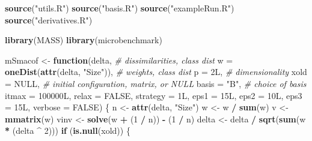 \documentclass[
  12pt,
]{article}
\newenvironment{Shaded}{\begin{snugshade}}{\end{snugshade}}
\newcommand{\AttributeTok}[1]{\textcolor[rgb]{0.13,0.29,0.53}{#1}}
\newcommand{\CommentTok}[1]{\textcolor[rgb]{0.56,0.35,0.01}{\textit{#1}}}
\newcommand{\ConstantTok}[1]{\textcolor[rgb]{0.56,0.35,0.01}{#1}}
\newcommand{\ControlFlowTok}[1]{\textcolor[rgb]{0.13,0.29,0.53}{\textbf{#1}}}
\newcommand{\DataTypeTok}[1]{\textcolor[rgb]{0.13,0.29,0.53}{#1}}
\newcommand{\DecValTok}[1]{\textcolor[rgb]{0.00,0.00,0.81}{#1}}
\newcommand{\FunctionTok}[1]{\textcolor[rgb]{0.13,0.29,0.53}{\textbf{#1}}}
\newcommand{\NormalTok}[1]{#1}
\newcommand{\OtherTok}[1]{\textcolor[rgb]{0.56,0.35,0.01}{#1}}
\newcommand{\SpecialCharTok}[1]{\textcolor[rgb]{0.81,0.36,0.00}{\textbf{#1}}}
\newcommand{\StringTok}[1]{\textcolor[rgb]{0.31,0.60,0.02}{#1}}
\begin{document}
\begin{Shaded}
\begin{Highlighting}[]
\FunctionTok{source}\NormalTok{(}\StringTok{"utils.R"}\NormalTok{)}
\FunctionTok{source}\NormalTok{(}\StringTok{"basis.R"}\NormalTok{)}
\FunctionTok{source}\NormalTok{(}\StringTok{"exampleRun.R"}\NormalTok{)}
\FunctionTok{source}\NormalTok{(}\StringTok{"derivatives.R"}\NormalTok{)}

\FunctionTok{library}\NormalTok{(MASS)}
\FunctionTok{library}\NormalTok{(microbenchmark)}

\NormalTok{mSmacof }\OtherTok{\textless{}{-}}
  \ControlFlowTok{function}\NormalTok{(delta,}
           \CommentTok{\# dissimilarities, class dist}
           \AttributeTok{w =} \FunctionTok{oneDist}\NormalTok{(}\FunctionTok{attr}\NormalTok{(delta, }\StringTok{"Size"}\NormalTok{)),}
           \CommentTok{\# weights, class dist}
           \AttributeTok{p =} \DecValTok{2}\DataTypeTok{L}\NormalTok{,}
           \CommentTok{\# dimensionality}
           \AttributeTok{xold =} \ConstantTok{NULL}\NormalTok{,}
           \CommentTok{\# initial configuration, matrix, or NULL}
           \AttributeTok{basis =} \StringTok{"B"}\NormalTok{,}
           \CommentTok{\# choice of basis}
           \AttributeTok{itmax =} \DecValTok{100000}\DataTypeTok{L}\NormalTok{,}
           \AttributeTok{relax =} \ConstantTok{FALSE}\NormalTok{,}
           \AttributeTok{strategy =} \DecValTok{1}\DataTypeTok{L}\NormalTok{,}
           \AttributeTok{eps1 =} \DecValTok{15}\DataTypeTok{L}\NormalTok{,}
           \AttributeTok{eps2 =} \DecValTok{10}\DataTypeTok{L}\NormalTok{,}
           \AttributeTok{eps3 =} \DecValTok{15}\DataTypeTok{L}\NormalTok{,}
           \AttributeTok{verbose =} \ConstantTok{FALSE}\NormalTok{) \{}
\NormalTok{    n }\OtherTok{\textless{}{-}} \FunctionTok{attr}\NormalTok{(delta, }\StringTok{"Size"}\NormalTok{)}
\NormalTok{    w }\OtherTok{\textless{}{-}}\NormalTok{ w }\SpecialCharTok{/} \FunctionTok{sum}\NormalTok{(w)}
\NormalTok{    v }\OtherTok{\textless{}{-}} \FunctionTok{mmatrix}\NormalTok{(w)}
\NormalTok{    vinv }\OtherTok{\textless{}{-}} \FunctionTok{solve}\NormalTok{(w }\SpecialCharTok{+}\NormalTok{ (}\DecValTok{1} \SpecialCharTok{/}\NormalTok{ n)) }\SpecialCharTok{{-}}\NormalTok{ (}\DecValTok{1} \SpecialCharTok{/}\NormalTok{ n)}
\NormalTok{    delta }\OtherTok{\textless{}{-}}\NormalTok{ delta }\SpecialCharTok{/} \FunctionTok{sqrt}\NormalTok{(}\FunctionTok{sum}\NormalTok{(w }\SpecialCharTok{*}\NormalTok{ (delta }\SpecialCharTok{\^{}} \DecValTok{2}\NormalTok{)))}
    \ControlFlowTok{if}\NormalTok{ (}\FunctionTok{is.null}\NormalTok{(xold)) \{}

\end{Highlighting}
\end{Shaded}
\end{document}
